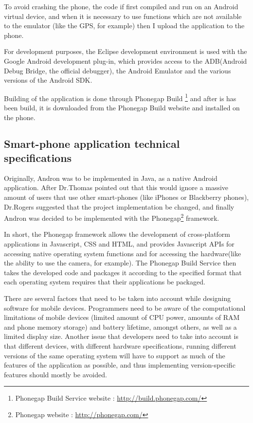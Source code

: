 \documentclass[12pt]{ecsproject}     %
\begin{document}
To avoid crashing the phone, the code if first compiled and run on an Android virtual device, and when it is necessary to use functions which are not available to the emulator (like the GPS, for example) then I upload the application to the phone.

For development purposes, the Eclipse development environment is used with the Google Android development plug-in, which provides access to the ADB(Android Debug Bridge, the official debugger), the Android Emulator and the various versions of the Android SDK.

Building of the application is done through Phonegap Build \footnote{Phonegap Build Service website : \hyperlink{http://build.phonegap.com/}{http://build.phonegap.com/}} and after is has been build, it is downloaded from the Phonegap Build website and installed on the phone.


\subsection{Smart-phone application technical specifications}
Originally, Andron was to be implemented in Java, as a native Android application. After Dr.Thomas pointed out that this would ignore a massive amount of users that use other smart-phones (like iPhones or Blackberry phones), Dr.Rogers suggested that the project implementation be changed, and finally Andron was decided to be implemented with the Phonegap\footnote{Phonegap website :  \hyperlink{http://phonegap.com/}{http://phonegap.com/}} framework.

 In short, the Phonegap framework allows the development of cross-platform applications in Javascript, CSS and HTML, and provides Javascript APIs for accessing native operating system functions and for accessing the hardware(like the ability to use the camera, for example). The Phonegap Build Service then takes the developed code and packages it according to the specified format that each operating system requires that their applications be packaged.

There are several factors that need to be taken into account while designing software for mobile devices. Programmers need to be aware of the computational limitations of mobile devices (limited amount of CPU power, amounts of RAM and phone memory storage) and battery lifetime, amongst others, as well as a limited display size. Another issue that developers need to take into account is that different devices, with different hardware specifications, running different versions of the same operating system will have to support as much of the features of the application as possible, and thus implementing version-specific features should mostly be avoided.
\end{document}

